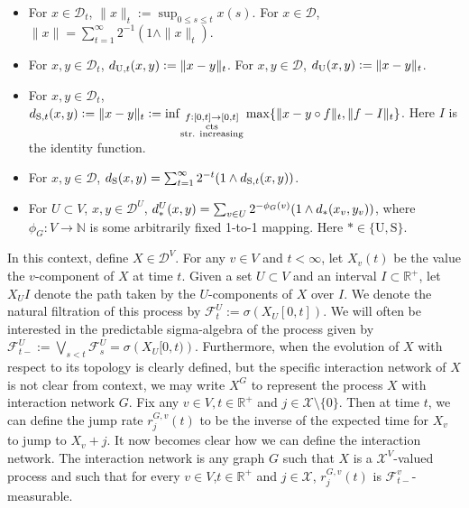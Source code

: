 \documentclass[12pt]{article}
\newcommand{\mb}{\mathbb}
\newcommand{\mc}{\mathcal}
\newcommand{\ra}{\rightarrow}
\newcommand{\te}{\text}
\newcommand{\ind}{\hspace{24pt}}
\newcommand{\defeq}{:=}								%
\newcommand{\cad}{\mc{D}}							%
\newcommand{\sta}{\mc{X}}							%
\newcommand{\Xf}{X}									%
\newcommand{\rate}{r}								%
\newcommand{\F}{\mc{F}}								%
\newcommand{\utmet}[1]{
\ifstrempty{#1}{
	d_{\te{U}}}{
	d_{\te{U},#1}}}									%
\newcommand{\stmet}[1]{
\ifstrempty{#1}{
	d_{\te{S}}}{
	d_{\te{S},#1}}}									%
\newcommand{\xf}{x}									%
\newcommand{\xg}{y}									%
\newcommand{\met}[2]{
\ifstrempty{#2}{
	d_{#1}}{
	d_{#1,#2}}}										%
\newcommand{\vind}[1]{_{#1}}						%
\newcommand{\tme}[1]{(#1)}							%
\newcommand{\tmi}[1]{#1}							%
\newcommand{\gind}[1]{^{#1}}						%
\newcommand{\vpara}[1]{^{#1}}						%
\newcommand{\stpara}[1]{_{#1}}						%
\newcommand{\tpara}[1]{_{#1}}						%
\newcommand{\gvpara}[2]{^{#1,#2}}					%
\begin{document}
\begin{itemize}
\item For \(\xf \in \cad\tpara{t}\), \(\|\xf\|\tpara{t} \defeq \sup_{0\leq s \leq t} \xf\tme{s}\). For \(\xf \in \cad\), \(\|\xf\| = \sum_{t=1}^\infty 2^{-1}(1\wedge \|\xf\|\tpara{t})\).

\item For \(\xf,\xg \in \cad\tpara{t}\), \(\utmet{t}(\xf,\xg) \defeq \|\xf-\xg\|\tpara{t}\). For \(\xf,\xg \in \cad\), \(\utmet{}(\xf,\xg) \defeq \|\xf - \xg\|\tpara{t}\).

\item For \(\xf,\xg \in \cad\tpara{t}\), \(\stmet{t}(\xf,\xg) \defeq \|\xf-\xg\|\tpara{t} \defeq \inf_{\substack{f:[0,t]\ra[0,t]\\\te{cts}\\\te{str. increasing}}}\max\{\|\xf-\xg\circ f\|\tpara{t},\|f - I\|\tpara{t}\}\). Here \(I\) is the identity function.

\item For \(\xf,\xg \in \cad\), \(\stmet{}(\xf,\xg) = \sum_{t=1}^\infty 2^{-t}(1\wedge \stmet{t}(\xf,\xg))\).

\item For \(U \subset V\), \(\xf,\xg\in \cad\vpara{U}\), \(\met{\ast}{}\vpara{U}(\xf,\xg) = \sum_{v \in U} 2^{-\phi_G(v)}(1\wedge \met{\ast}{}(\xf\vind{v},\xg\vind{v}))\), where \(\phi_G: V \ra \mb{N}\) is some arbitrarily fixed 1-to-1 mapping. Here \(\ast \in \{\te{U},\te{S}\}\).
\end{itemize}

\ind In this context, define \(\Xf \in \cad\vpara{V}\). For any \(v \in V\) and \(t < \infty\), let \(\Xf\vind{v}\tme{t}\) be the value the \(v\)-component of \(\Xf\) at time \(t\). Given a set \(U\subset V\) and an interval \(I \subset \mb{R}^+\), let \(\Xf\vind{U}\tmi{I}\) denote the path taken by the \(U\)-components of \(\Xf\) over \(\tmi{I}\). We denote the natural filtration of this process by \(\F\vpara{U}\tpara{t} \defeq \sigma \left(\Xf\vind{U}\tmi{[0,t]}\right)\). We will often be interested in the predictable sigma-algebra of the process given by \(\F\vpara{U}\tpara{t-} \defeq \bigvee_{s < t} \F\vpara{U}\tpara{s} = \sigma\left(\Xf\vind{U}\tmi{[0,t)}\right)\). Furthermore, when the evolution of \(\Xf\) with respect to its topology is clearly defined, but the specific interaction network of \(\Xf\) is not clear from context, we may write \(\Xf\gind{G}\) to represent the process \(\Xf\) with interaction network \(G\). Fix any \(v \in V,t \in \mb{R}^+\) and \(j \in \sta\setminus\{0\}\). Then at time \(t\), we can define the jump rate \(\rate\gvpara{G}{v}\stpara{j}(t)\) to be the inverse of the expected time for \(\Xf\vind{v}\) to jump to \(\Xf\vind{v} + j\). It now becomes clear how we can define the interaction network. The interaction network is any graph \(G\) such that \(\Xf\) is a \(\sta^V\)-valued process and such that for every \(v \in V\),\(t\in \mb{R}^+\) and \(j \in \sta\), \(\rate\gvpara{G}{v}\stpara{j}(t)\) is \(\F\vpara{v}\tpara{t-}\)-measurable. 
\end{document}
